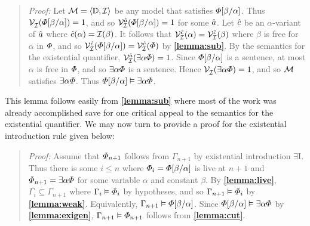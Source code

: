 \begin{quote} 
  \textit{Proof:} Let $\mathcal{M}=\langle\mathbb{D},\mathcal{I}\rangle$ be any model that satisfies $\varPhi[\beta/\alpha]$.
  Thus $\mathcal{V}_{\mathcal{I}}^{}(\varPhi[\beta/\alpha])=1$, and so $\mathcal{V}_{\mathcal{I}}^{\hat{a}}(\varPhi[\beta/\alpha])=1$ for some $\hat{a}$.
  Let $\hat{c}$ be an $\alpha$-variant of $\hat{a}$ where $\hat{c}(\alpha)=\mathcal{I}(\beta)$.
  It follows that $\mathcal{V}_{\mathcal{I}}^{\hat{c}}(\alpha)=\mathcal{V}_{\mathcal{I}}^{\hat{c}}(\beta)$ where $\beta$ is free for $\alpha$ in $\varPhi$, and so $\mathcal{V}_{\mathcal{I}}^{\hat{c}}(\varPhi[\beta/\alpha])=\mathcal{V}_{\mathcal{I}}^{\hat{c}}(\varPhi)$ by \textbf{\ref{lemma:sub}}.
  By the semantics for the existential quantifier, $\mathcal{V}_{\mathcal{I}}^{\hat{a}}(\exists \alpha\varPhi)=1$.
  Since $\varPhi[\beta/\alpha]$ is a sentence, at most $\alpha$ is free in $\varPhi$, and so $\exists \alpha\varPhi$ is a sentence. 
  Hence $\mathcal{V}_{\mathcal{I}}^{}(\exists \alpha\varPhi)=1$, and so $\mathcal{M}$ satisfies $\exists \alpha\varPhi$.
  Thus $\varPhi[\beta/\alpha] \vDash \exists\alpha\varPhi$.
\end{quote}

This lemma follows easily from \textbf{\ref{lemma:sub}} where most of the work was already accomplished save for one critical appeal to the semantics for the existential quantifier.
We may now turn to provide a proof for the existential introduction rule given below:




\begin{quote} 
  \textit{Proof:} Assume that $\varPhi_{n+1}$ follows from $\Gamma_{n+1}$ by existential introduction $\exists$I.
  Thus there is some $i\leq n$ where $\varPhi_i=\varPhi[\beta/\alpha]$ is live at $n+1$ and $\varPhi_{n+1}=\exists \alpha\varPhi$ for some variable $\alpha$ and constant $\beta$.
  By \textbf{\ref{lemma:live}}, $\Gamma_i\subseteq \Gamma_{n+1}$ where $\Gamma_i\vDash\varPhi_i$ by hypotheses, and so $\Gamma_{n+1} \vDash \varPhi_i$ by \textbf{\ref{lemma:weak}}.
  Equivalently, $\Gamma_{n+1} \vDash \varPhi[\beta/\alpha]$.
  Since $\varPhi[\beta/\alpha] \vDash \exists \alpha\varPhi$ by \textbf{\ref{lemma:exigen}}, $\Gamma_{n+1}\vDash\varPhi_{n+1}$ follows from \textbf{\ref{lemma:cut}}.
\end{quote}

